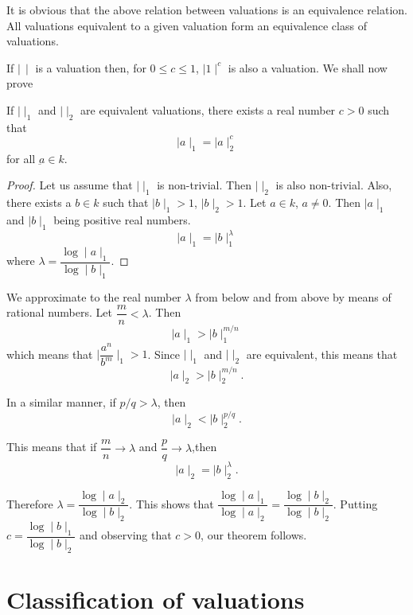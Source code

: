 It is obvious that the  above relation between valuations is  an
equivalence relation. All valuations equivalent to a given valuation
form an equivalence class of valuations. 

If $ \mid \, \mid $ is a valuation then, for $ 0 \leq c \leq 1$, $\mid 1
\mid^c $ is also a valuation. We shall now prove   

\setcounter{thm}{0}
\begin{thm}%
If $ \mid \mid_1 $  and $ \mid \mid_2 $ are equivalent
  valuations, there exists a real number $ c > 0 $ such that 
$$
\mid a \mid_1 =  \mid a \mid^c_2
$$
for all $ \underbar{a} \in k $.
\end{thm}

\begin{proof}
 Let us assume that $ \mid \mid_1 $ is non-trivial. Then $ \mid \mid_2
 $ is also non-trivial. Also, there exists a $b \in k $ such
 that $ \mid b \mid_1 > 1 $, $ \mid b \mid_2  > 1 $. Let $ a \in k $,
 $ a \neq 0 $. Then $ \mid a \mid_1 $ and $ \mid b \mid_1 $ being
 positive real numbers.  
 $$
 \mid a  \mid_1 = \mid b \mid^\lambda_1
 $$
 where $ \lambda = \dfrac{ \log \mid a \mid_1}{\log \mid b \mid_1} $. 
\end{proof}

We approximate to the real number $ \lambda $ from below and from
above by means of rational numbers. Let $ \dfrac{m}{n} < \lambda
$. Then  
$$
\mid a \mid_1 > \mid b \mid_1^{m/n}
$$
which means that  $ \mid  \dfrac{a^n}{b^m} \mid_1 > 1 $. Since $ \mid
\mid_1 $ and $ \mid \mid_2 $ are equivalent, this means that  
$$
\mid a \mid_2 > \mid b \mid^{m/n}_2 .
$$

In a similar manner, if $ p /q  > \lambda $, then
$$
\mid a \mid_2 < \mid b \mid^{p/q}_2 .
$$\pageoriginale

This means that if $ \dfrac{m}{n} \rightarrow \lambda $ and $
\dfrac{p}{q} \rightarrow \lambda $,then  
$$
\mid a \mid_2 = \mid b \mid^\lambda_2 .
$$

Therefore $ \lambda = \dfrac{\log \mid a \mid_2}{\log \mid b \mid_2}
$. This  shows that $ \dfrac{\log \mid a \mid_1}{\log \mid a \mid_2} =
\dfrac{\log \mid b \mid_2}{\log \mid b \mid_2} $. Putting $ c =
\dfrac{\log \mid b \mid_1}{\log \mid b \mid_2} $ and observing that $
c > 0 $, our theorem follows. 


\section{Classification of valuations}%

